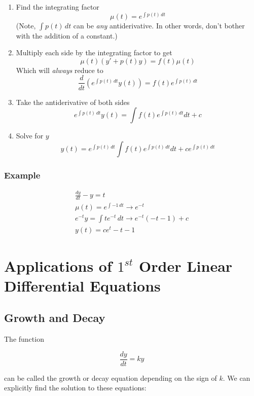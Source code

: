 \documentclass[12pt, landscape, twocolumn]{article}
\begin{document}
    \begin{enumerate}
    \item Find the integrating factor
        \[
        \mu(t) = e^{\int p(t) \, dt}
        \]
        (Note, $\int p(t) \, dt$ can be \textit{any} antiderivative. In other words, don't bother with the addition of a constant.)
    \item Multiply each side by the integrating factor to get
        \[
        \mu(t)(y\prime + p(t)y) = f(t)\mu(t)
        \]
        Which will \textit{always} reduce to
        \[
        \frac{d}{dt} \left( e^{\int p(t) \, dt} y(t) \right) = f(t) e^{\int p(t) \, dt}
        \]
    \item Take the antiderivative of both sides
        \[
        e^{\int p(t) \, dt} y(t) = \int f(t) e^{\int p(t) \, dt} dt + c
        \]
    \item Solve for $y$
        \begin{equation}\label{eq:ifmethod}
        y(t) = e^{\int p(t) \, dt} \int f(t) e^{\int p(t) \, dt} dt + c e^{\int p(t) \, dt}
        \end{equation}
    \end{enumerate}

        \subsubsection{Example}
        \[
        \begin{aligned}
        \frac{dy}{dt} - y = t\\
        \mu(t) = e^{\int -1 \, dt} \to e^{-t}\\
        e^{-t}y = \int t e^{-t} \, dt \to e^{-t} (-t - 1) + c\\
        y(t) = c e^t - t - 1
        \end{aligned}
        \]

\section{Applications of $1^{st}$ Order Linear Differential Equations}
    \subsection{Growth and Decay}

    The function

    \[
    \frac{dy}{dt} = ky
    \]

    can be called the growth or decay equation depending on the sign of $k$. We can explicitly find the solution to these equations:
\end{document}
